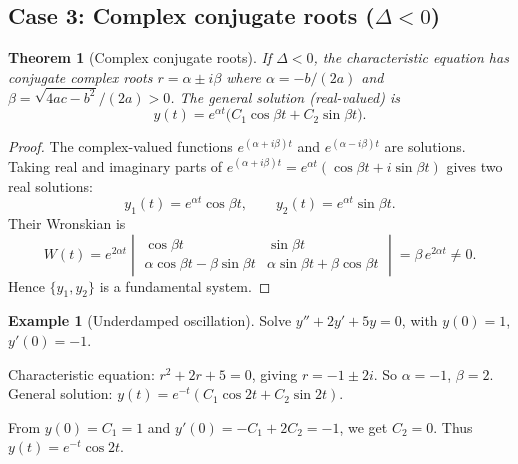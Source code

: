 \documentclass[12pt,a4paper,openany]{book}
\theoremstyle{definition}
\newtheorem{example}[definition]{Example}
\theoremstyle{plain}
\newtheorem{theorem}[definition]{Theorem}
\theoremstyle{remark}
\begin{document}
\subsection{Case 3: Complex conjugate roots ($\Delta < 0$)}\label{subsec:case3}

\begin{theorem}[Complex conjugate roots]\label{thm:complex-roots}
If $\Delta < 0$, the characteristic equation has conjugate complex roots
$r = \alpha \pm i\beta$ where $\alpha = -b/(2a)$ and
$\beta = \sqrt{4ac - b^2}/(2a) > 0$. The general solution (real-valued) is
\begin{equation}\label{eq:gen-sol-case3}
  y(t) = e^{\alpha t}\bigl(C_1 \cos\beta t + C_2 \sin\beta t\bigr).
\end{equation}
\end{theorem}

\begin{proof}
The complex-valued functions $e^{(\alpha+i\beta)t}$ and
$e^{(\alpha-i\beta)t}$ are solutions. Taking real and imaginary parts of
$e^{(\alpha+i\beta)t} = e^{\alpha t}(\cos\beta t + i\sin\beta t)$ gives two
real solutions:
\[
  y_1(t) = e^{\alpha t}\cos\beta t, \qquad
  y_2(t) = e^{\alpha t}\sin\beta t.
\]
Their Wronskian is
\[
  W(t) = e^{2\alpha t}
  \begin{vmatrix}
    \cos\beta t & \sin\beta t \\
    \alpha\cos\beta t - \beta\sin\beta t &
    \alpha\sin\beta t + \beta\cos\beta t
  \end{vmatrix}
  = \beta\,e^{2\alpha t} \ne 0.
\]
Hence $\{y_1, y_2\}$ is a fundamental system.
\end{proof}

\begin{example}[Underdamped oscillation]\label{ex:underdamped}
Solve $y'' + 2y' + 5y = 0$, with $y(0) = 1$, $y'(0) = -1$.

Characteristic equation: $r^2 + 2r + 5 = 0$, giving
$r = -1 \pm 2i$. So $\alpha = -1$, $\beta = 2$.
General solution: $y(t) = e^{-t}(C_1\cos 2t + C_2\sin 2t)$.

From $y(0) = C_1 = 1$ and $y'(0) = -C_1 + 2C_2 = -1$, we get $C_2 = 0$.
Thus $y(t) = e^{-t}\cos 2t$.
\end{example}
\end{document}

